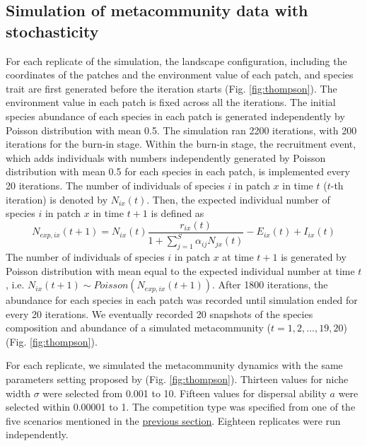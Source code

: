 \subsection{Simulation of metacommunity data with stochasticity}
\noindent
For each replicate of the simulation, the landscape configuration, including the coordinates of the patches and the environment value of each patch, and species trait are first generated before the iteration starts (Fig. \ref{fig:thompson}). The environment value in each patch is fixed across all the iterations. The initial species abundance of each species in each patch is generated independently by Poisson distribution with mean 0.5. The simulation ran 2200 iterations, with 200 iterations for the burn-in stage. Within the burn-in stage, the recruitment event, which adds individuals with numbers independently generated by Poisson distribution with mean 0.5 for each species in each patch, is implemented every 20 iterations. The number of individuals of species $i$ in patch $x$ in time $t$ ($t$-th iteration) is denoted by $N_{ix}(t)$. Then, the expected individual number of species $i$ in patch $x$ in time $t+1$ is defined as 
\[
N_{exp,ix}(t+1) = N_{ix}(t)\dfrac{r_{ix}(t)}{1+\sum_{j = 1}^S\alpha_{ij}N_{jx}(t)} - E_{ix}(t)+I_{ix}(t)
\]
The number of individuals of species $i$ in patch $x$ at time $t+1$ is generated by Poisson distribution with mean equal to the expected individual number at time $t$, i.e. $N_{ix}(t+1)\sim Poisson(N_{exp,ix}(t+1))$. After 1800 iterations, the abundance for each species in each patch was recorded until simulation ended for every 20 iterations. We eventually recorded 20 snapshots of the species composition and abundance of a simulated metacommunity ($t = 1,2,...,19,20$) (Fig. \ref{fig:thompson}). 

For each replicate, we simulated the metacommunity dynamics with the same parameters setting proposed by \citet{thompson2020process} (Fig. \ref{fig:thompson}). Thirteen values for niche width $\sigma$ were selected from 0.001 to 10. Fifteen values for dispersal ability $a$ were selected within 0.00001 to 1. The competition type was specified from one of the five scenarios mentioned in the \hyperref[Modelc]{previous section}. Eighteen replicates were run independently.

